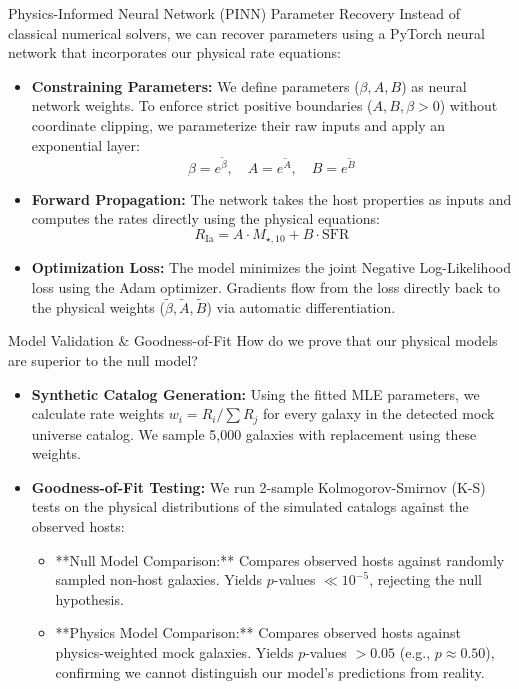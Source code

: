 \documentclass[9pt]{beamer}
\begin{document}
\begin{frame}{Physics-Informed Neural Network (PINN) Parameter Recovery}
  Instead of classical numerical solvers, we can recover parameters using a PyTorch neural network that incorporates our physical rate equations:
  \begin{itemize}
    \item \textbf{Constraining Parameters:} We define parameters ($\beta, A, B$) as neural network weights. To enforce strict positive boundaries ($A, B, \beta > 0$) without coordinate clipping, we parameterize their raw inputs and apply an exponential layer:
      $$\beta = e^{\tilde{\beta}}, \quad A = e^{\tilde{A}}, \quad B = e^{\tilde{B}}$$
    \item \textbf{Forward Propagation:} The network takes the host properties as inputs and computes the rates directly using the physical equations:
      $$R_{\text{Ia}} = A \cdot M_{\star, 10} + B \cdot \text{SFR}$$
    \item \textbf{Optimization Loss:} The model minimizes the joint Negative Log-Likelihood loss using the Adam optimizer. Gradients flow from the loss directly back to the physical weights ($\tilde{\beta}, \tilde{A}, \tilde{B}$) via automatic differentiation.
  \end{itemize}
\end{frame}

\begin{frame}{Model Validation \& Goodness-of-Fit}
  How do we prove that our physical models are superior to the null model?
  \begin{itemize}
    \item \textbf{Synthetic Catalog Generation:}
      Using the fitted MLE parameters, we calculate rate weights $w_i = R_i / \sum R_j$ for every galaxy in the detected mock universe catalog. We sample 5,000 galaxies with replacement using these weights.
    \item \textbf{Goodness-of-Fit Testing:}
      We run 2-sample Kolmogorov-Smirnov (K-S) tests on the physical distributions of the simulated catalogs against the observed hosts:
      \begin{itemize}
        \item **Null Model Comparison:** Compares observed hosts against randomly sampled non-host galaxies. Yields $p$-values $\ll 10^{-5}$, rejecting the null hypothesis.
        \item **Physics Model Comparison:** Compares observed hosts against physics-weighted mock galaxies. Yields $p$-values $> 0.05$ (e.g., $p \approx 0.50$), confirming we cannot distinguish our model's predictions from reality.
      \end{itemize}
  \end{itemize}
\end{frame}
\end{document}
